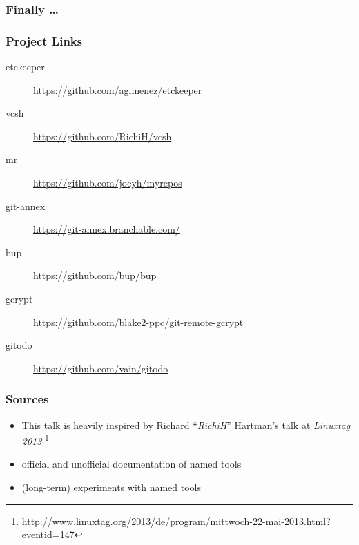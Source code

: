 \documentclass[english,hyperref={pdfpagelabels=false},aspectratio=169]{beamer}
\begin{document}
\begin{frame}
  \frametitle{Finally \dots}
  \huge
  \begin{center}
  \end{center}
\end{frame}


\begin{frame}
  \frametitle{Project Links}
  \begin{description}
    \item[etckeeper] \url{https://github.com/agimenez/etckeeper}
    \item[vcsh] \url{https://github.com/RichiH/vcsh}
    \item[mr] \url{https://github.com/joeyh/myrepos}
    \item[git-annex] \url{https://git-annex.branchable.com/}
    \item[bup] \url{https://github.com/bup/bup}
    \item[gcrypt] \url{https://github.com/blake2-ppc/git-remote-gcrypt}
    \item[gitodo] \url{https://github.com/vain/gitodo}
  \end{description}
\end{frame}


\begin{frame}
  \frametitle{Sources}
  \begin{itemize}
    \item This talk is heavily inspired by Richard ``\textit{RichiH}'' Hartman's talk at \textit{Linuxtag 2013}
      \footnote{\tiny\url{http://www.linuxtag.org/2013/de/program/mittwoch-22-mai-2013.html?eventid=147}}
    \item official and unofficial documentation of named tools
    \item (long-term) experiments with named tools
  \end{itemize}
\end{frame}
\end{document}
